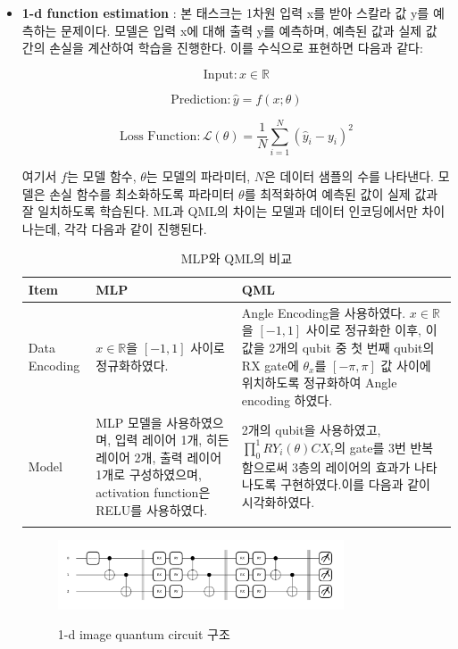\begin{itemize}
        \item \textbf{1-d function estimation} :
본 태스크는 1차원 입력 x를 받아 스칼라 값 y를 예측하는 문제이다. 모델은 입력 x에 대해 출력 y를 예측하며, 예측된 값과 실제 값 간의 손실을 계산하여 학습을 진행한다. 이를 수식으로 표현하면 다음과 같다:

\[
\text{Input}: x \in \mathbb{R}
\]

\[
\text{Prediction}: \hat{y} = f(x; \theta)
\]

\[
\text{Loss Function}: \mathcal{L}(\theta) = \frac{1}{N} \sum_{i=1}^{N} (\hat{y}_i - y_i)^2
\]

여기서 \(f\)는 모델 함수, \(\theta\)는 모델의 파라미터, \(N\)은 데이터 샘플의 수를 나타낸다. 모델은 손실 함수를 최소화하도록 파라미터 \(\theta\)를 최적화하여 예측된 값이 실제 값과 잘 일치하도록 학습된다. ML과 QML의 차이는 모델과 데이터 인코딩에서만 차이나는데, 각각 다음과 같이 진행된다.


\begin{table}[ht]
    \centering
    \begin{tabular}{ l||p{5.5cm}||p{5.5cm}}
    \Xhline{3\arrayrulewidth}
    \textbf{Item} & \textbf{MLP} & \textbf{QML} \\
    \hline
    Data Encoding & $x \in \mathbb{R}$을 $[-1, 1]$ 사이로 정규화하였다. &
    Angle Encoding을 사용하였다. $x \in \mathbb{R}$을 $[-1, 1]$ 사이로 정규화한 이후, 이 값을 2개의 qubit 중 첫 번째 qubit의 RX gate에 $\theta_x$를 $[-\pi, \pi]$ 값 사이에 위치하도록 정규화하여 Angle encoding 하였다. \\
    \hline
    Model & MLP 모델을 사용하였으며, 입력 레이어 1개, 히든 레이어 2개, 출력 레이어 1개로 구성하였으며, activation function은 RELU를 사용하였다. &
    2개의 qubit을 사용하였고, $\prod_{0}^{1} RY_i(\theta)CX_i$의 gate를 3번 반복함으로써 3층의 레이어의 효과가 나타나도록 구현하였다.이를 다음과 같이 시각화하였다.{fig:1d-image} \\
    \Xhline{3\arrayrulewidth}
    \end{tabular}
    \caption{MLP와 QML의 비교}
    \label{tab:mlp_qml_comparison_1d}
\end{table}

\begin{figure}[h]
    \centering
    \includegraphics[width=0.8\textwidth]{figs/pqc_1d}\
\caption{1-d image quantum circuit 구조}
\label{fig:1d-image}
\end{figure}
\end{itemize}
\clearpage

